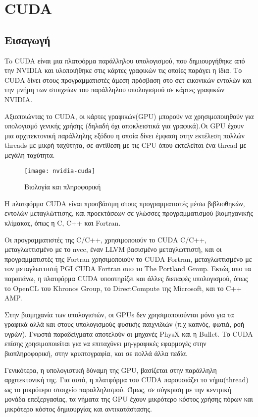 \section{CUDA}
\subsection{Εισαγωγή}
To CUDA είναι μια πλατφόρμα παράλληλου υπολογισμού, που δημιουργήθηκε από την NVIDIA και υλοποιήθηκε στις κάρτες γραφικών τις οποίες παράγει η ίδια. Το CUDA δίνει στους προγραμματιστές άμεση πρόσβαση στο σετ εικονικών εντολών και την μνήμη των στοιχείων του παράλληλου υπολογισμού σε κάρτες γραφικών NVIDIA. 

Αξιοποιώντας το CUDA, οι κάρτες γραφικών(GPU) μπορούν να χρησιμοποιηθούν για υπολογισμό γενικής χρήσης (δηλαδή όχι αποκλειστικά για γραφικά).Οι GPU έχουν μια αρχιτεκτονική παράλληλης εξόδου η οποία δίνει έμφαση στην εκτέλεση πολλών threads με μικρή ταχύτητα, σε αντίθεση με τις CPU όπου εκτελείται ένα thread με μεγάλη ταχύτητα. 

\begin{figure}[h]
\centering
\texttt{[image: nvidia-cuda]}
\caption{Βιολογία και πληροφορική}
\end{figure}

Η πλατφόρμα CUDA είναι προσβάσιμη στους προγραμματιστές μέσω βιβλιοθηκών, εντολών μεταγλώττισης, και προεκτάσεων σε γλώσσες προγραμματισμού βιομηχανικής κλίμακας, όπως η C, C++ και Fortran.

Οι προγραμματιστές της C/C++, χρησιμοποιούν το CUDA C/C++, μεταγλωττισμένο με το nvcc, έναν LLVM βασισμένο μεταγλωττιστή, και οι προγραμματιστές της Fortran χρησιμοποιούν το CUDA Fortran, μεταγλωττισμένο με τον μεταγλωττιστή PGI CUDA Fortran απο το The Portland Group. Εκτώς απο τα παραπάνω, η πλατφόρμα CUDA υποστηρίζει και άλλες διεπαφές υπολογισμού, όπως το OpenCL του Khronos Group, το DirectCompute της Microsoft, και το C++ AMP.

Στην βιομηχανία των υπολογιστών, οι GPUs δεν χρησιμοποιούνται μόνο για τα γραφικά αλλά και στους υπολογισμούς φυσικής παιχνιδιών (π.χ καπνός, φωτιά, ροή υγρών). Γνωστά παραδείγματα αποτελούν οι μηχανές PhysX και η Bullet. Το CUDA επίσης χρησιμοποιείται για να επιταχύνει μη-γραφικές εφαρμογές στην βιοπληροφορική, στην κρυπτογραφία, και σε πολλά άλλα πεδία.

Γενικότερα, η υπολογιστική δύναμη της GPU, βασίζεται στην παράλληλη αρχιτεκτονική της. Για αυτό, η πλατφόρμα του CUDA παρουσιάζει το νήμα(thread) ως το μικρότερο στοιχείο παραλληλισμού. Όμως, σε σύγκριση με την κεντρική μονάδα επεξεργασίας, τα νήματα της GPU έχουν μικρότερο κόστος χρήσης πόρων και μικρότερο κόστος δημιουργίας και αντικατάστασης.

